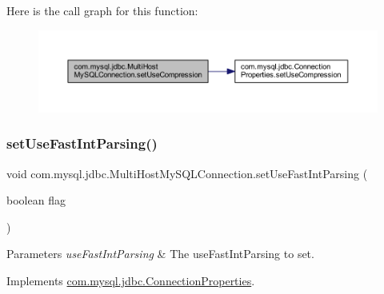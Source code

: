 Here is the call graph for this function\+:
\nopagebreak
\begin{figure}[H]
\begin{center}
\leavevmode
\includegraphics[width=350pt]{classcom_1_1mysql_1_1jdbc_1_1_multi_host_my_s_q_l_connection_ac6291b99cbc9ae36778e00c3c95603b2_cgraph}
\end{center}
\end{figure}
\mbox{\label{classcom_1_1mysql_1_1jdbc_1_1_multi_host_my_s_q_l_connection_a98e6251a2f619959c059daff4a1411a7}} 
\subsubsection{\texorpdfstring{set\+Use\+Fast\+Int\+Parsing()}{setUseFastIntParsing()}}
{\footnotesize\ttfamily void com.\+mysql.\+jdbc.\+Multi\+Host\+My\+S\+Q\+L\+Connection.\+set\+Use\+Fast\+Int\+Parsing (\begin{DoxyParamCaption}\item[{boolean}]{flag }\end{DoxyParamCaption})}


\begin{DoxyParams}{Parameters}
{\em use\+Fast\+Int\+Parsing} & The use\+Fast\+Int\+Parsing to set. \\
\hline
\end{DoxyParams}


Implements \mbox{\hyperlink{interfacecom_1_1mysql_1_1jdbc_1_1_connection_properties_a64d13f1fe9290e34ad189fd0eb13b81d}{com.\+mysql.\+jdbc.\+Connection\+Properties}}.

